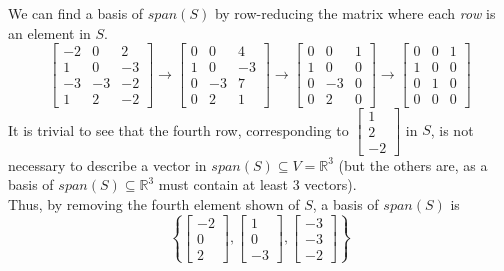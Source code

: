 \documentclass[]{article}
\newcommand{\reals}{\mathbb{R}}
\newcommand{\bmat}[1]{\begin{bmatrix}#1\end{bmatrix}}
\begin{document}
\section{}
We can find a basis of $span(S)$ by row-reducing the matrix where each \emph{row} is an element in $S$.
\[\bmat{-2 & 0 & 2\\1 & 0 & -3\\-3&-3&-2\\1&2&-2} \longrightarrow \bmat{0 & 0 & 4\\1 & 0 & -3\\ 0 & -3 & 7\\ 0 & 2 & 1} \longrightarrow \bmat{0&0&1\\1&0&0\\0&-3&0\\0&2&0} \longrightarrow \bmat{0&0&1\\1&0&0\\0&1&0\\0&0&0}\]
It is trivial to see that the fourth row, corresponding to $\bmat{1\\2\\-2}$ in $S$, is not necessary to describe a vector in $span(S) \subseteq V = \reals^3$ (but the others are, as a basis of $span(S) \subseteq \reals^3$ must contain at least 3 vectors).\\ Thus, by removing the fourth element shown of $S$, a basis of $span(S)$ is \[ \boxed{\left\{\bmat{-2\\0\\2}, \bmat{1\\0\\-3}, \bmat{-3\\-3\\-2}\right\}} \]
\end{document}
